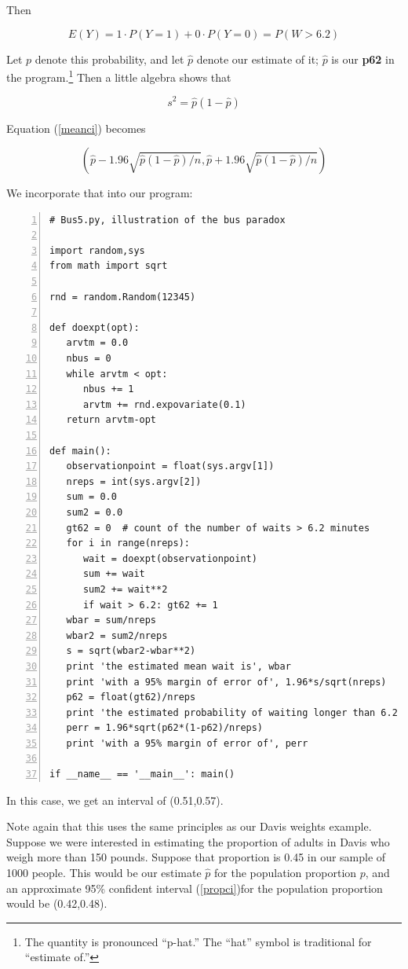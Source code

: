 Then

\begin{equation}
E(Y) = 1 \cdot P(Y = 1) + 0 \cdot P(Y = 0) = P(W > 6.2)
\end{equation}

Let $p$ denote this probability, and let $\hat{p}$ denote our estimate
of it; $\hat{p}$ is our {\bf p62} in the program.\footnote{The quantity
is pronounced ``p-hat.''  The ``hat'' symbol is traditional for
``estimate of.''}  Then a little algebra shows that

\begin{equation}
s^2 = \hat{p} (1-\hat{p})
\end{equation}

Equation (\ref{meanci}) becomes

\begin{equation}
\label{propci}
\left ( 
\hat{p} 
- 1.96 \sqrt{\hat{p} (1-\hat{p})/n},
\hat{p}
+ 1.96 \sqrt{\hat{p} (1-\hat{p})/n}
\right ) 
\end{equation}

We incorporate that into our program:

\begin{Verbatim}[fontsize=\relsize{-2},numbers=left]
# Bus5.py, illustration of the bus paradox

import random,sys
from math import sqrt

rnd = random.Random(12345)

def doexpt(opt):
   arvtm = 0.0
   nbus = 0
   while arvtm < opt:
      nbus += 1
      arvtm += rnd.expovariate(0.1)
   return arvtm-opt

def main():
   observationpoint = float(sys.argv[1])
   nreps = int(sys.argv[2])
   sum = 0.0
   sum2 = 0.0
   gt62 = 0  # count of the number of waits > 6.2 minutes
   for i in range(nreps):
      wait = doexpt(observationpoint)
      sum += wait
      sum2 += wait**2
      if wait > 6.2: gt62 += 1
   wbar = sum/nreps
   wbar2 = sum2/nreps
   s = sqrt(wbar2-wbar**2)
   print 'the estimated mean wait is', wbar
   print 'with a 95% margin of error of', 1.96*s/sqrt(nreps)
   p62 = float(gt62)/nreps
   print 'the estimated probability of waiting longer than 6.2 is', p62
   perr = 1.96*sqrt(p62*(1-p62)/nreps)
   print 'with a 95% margin of error of', perr

if __name__ == '__main__': main()
\end{Verbatim}

In this case, we get an interval of (0.51,0.57).

Note again that this uses the same principles as our Davis weights
example.  Suppose we were interested in estimating the proportion of
adults in Davis who weigh more than 150 pounds.  Suppose that proportion
is 0.45 in our sample of 1000 people.  This would be our estimate
$\hat{p}$ for the population proportion $p$, and an approximate 95\%
confident interval (\ref{propci})for the population proportion would be
(0.42,0.48).

